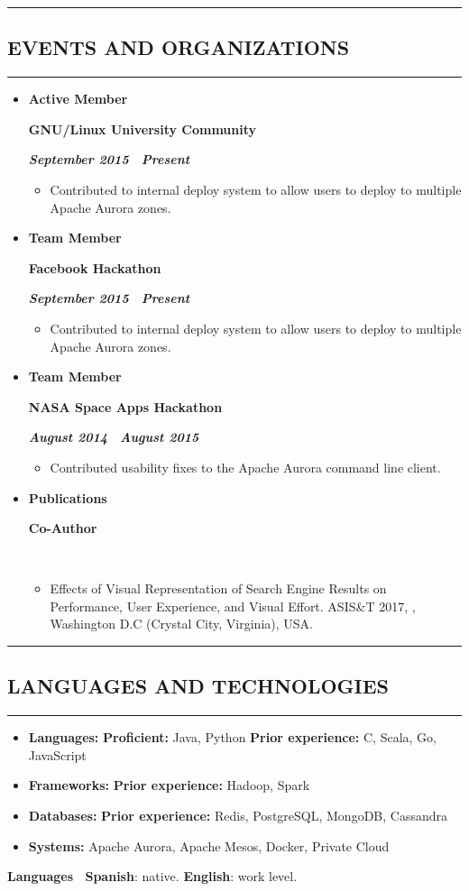 \documentclass[10pt,letterpaper]{article}
\newcommand{\textbox}[1]{
  \parbox{.333\textwidth}{#1}
}
\newcommand{\CPP}
{C\nolinebreak[4]\hspace{-.05em}\raisebox{.22ex}{\footnotesize\bf ++}}
\newcommand{\sectionTitle}[1]{
  \hrule
  \vspace{-1.0em} 
  \subsection*{\uppercase{\textbf{#1}}}
  \vspace{-0.3em}
    \hrule
}
\newcommand{\languageSection}[4]{
  \vspace{-0.5em}
  \begin{center}
    \textbf{Languages \textendash \ }\textbf{#1}: #2. \textbf{#3}: #4.
  \end{center}
}
\newcommand{\titleExperienceWithoutLocation}[4]{
  \vspace{1.0em}
  
  \item[]
  {
    \textbox{\textbf{#1}\hfill}\textbox{\hfil \textbf{#2}\hfil}\hfill \textbf{\emph{#3 \textendash \ #4}}
  }
}
\begin{document}
  \sectionTitle{Events and Organizations}
  \begin{itemize}[leftmargin=*]
    \parskip=-0.6em 
    \titleExperienceWithoutLocation{Active Member}{GNU/Linux University Community}{September 2015}{Present}
      \begin{itemize}[label=\textbullet]
        \itemsep0em
        \item Contributed to internal deploy system to allow users to deploy to multiple Apache Aurora zones.
      \end{itemize}
  
    \titleExperienceWithoutLocation{Team Member}{Facebook Hackathon}{September 2015}{Present}
      \begin{itemize}[label=\textbullet]
        \itemsep0em
        \item Contributed to internal deploy system to allow users to deploy to multiple Apache Aurora zones.
      \end{itemize}
  
    \titleExperienceWithoutLocation{Team Member}{NASA Space Apps Hackathon}{August 2014}{August 2015}
      \begin{itemize}[label=\textbullet]
        \itemsep0em
        \item Contributed usability fixes to the Apache Aurora command line client.
      \end{itemize}

    \titleExperienceWithoutLocation{Publications}{Co-Author}{}{}
      \begin{itemize}[label=\textbullet]
        \itemsep0em
        \item Effects of Visual Representation of Search Engine Results on Performance, User Experience, and Visual Effort. ASIS\&T 2017, , Washington D.C (Crystal City, Virginia), USA.
      \end{itemize}
    \end{itemize} 
  
  \sectionTitle{Languages and Technologies}
  \vspace{0.20em}
  \begin{itemize}[label=\textbullet]
    \itemsep0em
    \item \textbf{Languages:} \textbf{Proficient:} Java, Python \textbf{Prior experience:} \CPP, Scala, Go, JavaScript
    \item \textbf{Frameworks:} \textbf{Prior experience:} Hadoop, Spark
    \item \textbf{Databases:} \textbf{Prior experience:} Redis, PostgreSQL, MongoDB, Cassandra
    \item \textbf{Systems:} Apache Aurora, Apache Mesos, Docker, Private Cloud
  \end{itemize}
  
  \languageSection{Spanish}{native}{English}{work level}
  
\end{document}
